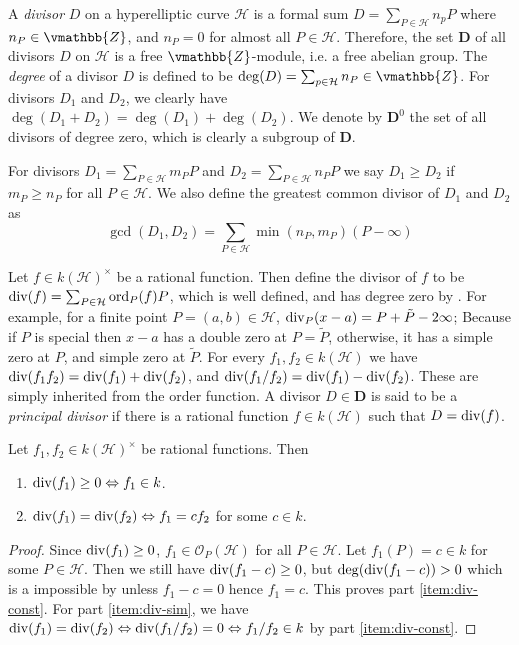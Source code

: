 A \textit{divisor} $D$ on a hyperelliptic curve $\mathcal{H}$ is a formal sum $D = \sum_{P \in 
\mathcal{H}} n_p P$ where $n_P \in \vmathbb{Z}$, and $n_P = 0$ for almost all $P \in \mathcal{H}$. 
Therefore, the set $\mathbf{D}$ of all divisors $D$ on $\mathcal{H}$ is a free $\vmathbb{Z}$-module, 
i.e. a free abelian group. The \textit{degree} of a divisor $D$ is defined to be $\deg(D) = \sum_{p 
\in \mathcal{H}}n_P \in \vmathbb{Z}$. For divisors $D_1$ and $D_2$, we clearly have $\deg(D_1 + D_2) 
= \deg(D_1) + \deg(D_2)$. We denote by $\mathbf{D}^0$ the set of all divisors of degree zero, which 
is clearly a subgroup of $\mathbf{D}$. 
\begin{definition}
For divisors $D_1 = \sum_{P \in \mathcal{H}} m_PP$ and $D_2 = \sum_{P \in \mathcal{H}} n_PP$ we say 
$D_1 \ge D_2$ if $m_P \ge n_P$ for all $P \in \mathcal{H}$. We also define the greatest common 
divisor of $D_1$ and $D_2$ as
$$
\gcd(D_1, D_2) = \sum_{P \in \mathcal{H}} \min(n_P, m_P)(P - \infty)
$$
\end{definition}
Let $f \in k(\mathcal{H})^\times$ be a rational function. Then define the divisor of $f$ to be 
$\operatorname{div}(f) = \sum_{P \in \mathcal{H}} \operatorname{ord}_P(f)P$, which is well defined, and has degree zero by 
. For example, for a finite point $P = (a, b) \in \mathcal{H}$, 
$\operatorname{div}_P(x - a) = P + \tilde{P} - 2\infty$; Because if $P$ is special then $x - a$ has a double 
zero at $P = \tilde{P}$, otherwise, it has a simple zero at $P$, and simple zero at $\tilde{P}$. For 
every $f_1, f_2 \in k(\mathcal{H})$ we have $\operatorname{div}(f_1f_2) = \operatorname{div}(f_1) + \operatorname{div}(f_2)$, and 
$\operatorname{div}(f_1 / f_2) = \operatorname{div}(f_1) - \operatorname{div}(f_2)$. These are simply inherited from the order 
function. A divisor $D \in \mathbf{D}$ is said to be a \textit{principal divisor} if there is a 
rational function $f \in k(\mathcal{H})$ such that $D = \operatorname{div}(f)$.
\begin{proposition}
\label{proposition:div-const}
Let $f_1, f_2 \in k(\mathcal{H})^\times$ be rational functions. Then
\begin{enumerate}
\item 
\label{item:div-const}
$\operatorname{div}(f_1) \ge 0 \Leftrightarrow f_1 \in k$.
\item 
\label{item:div-sim}
$\operatorname{div}(f_1) = \operatorname{div}(f_2) \Leftrightarrow f_1 = cf_2$ for some $c \in k$.
\end{enumerate}
\end{proposition}
\begin{proof}
Since $\operatorname{div}(f_1) \ge 0$, $f_1 \in \mathcal{O}_P(\mathcal{H})$ for all $P \in \mathcal{H}$. Let 
$f_1(P) = c \in k$ for some $P \in \mathcal{H}$. Then we still have $\operatorname{div}(f_1 - c) \ge 0$, but 
$\deg(\operatorname{div}(f_1 - c)) > 0$ which is a impossible by  unless 
$f_1 - c = 0$ hence $f_1 = c$. This proves part \ref{item:div-const}. For part \ref{item:div-sim}, 
we have $\operatorname{div}(f_1) = \operatorname{div}(f_2) \Leftrightarrow \operatorname{div}(f_1 / f_2) = 0 \Leftrightarrow f_1 / 
f_2 \in k$ by part \ref{item:div-const}.
\end{proof}
